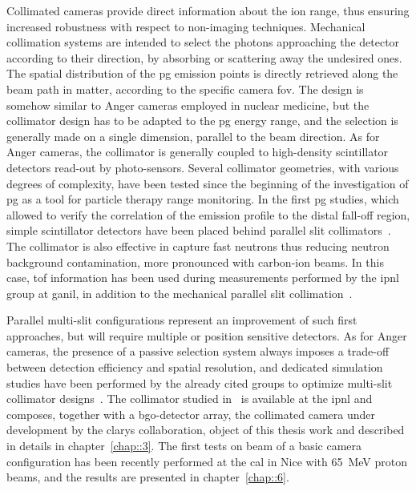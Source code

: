 Collimated cameras provide direct information about the ion range, thus ensuring increased robustness with respect to non-imaging techniques.
Mechanical collimation systems are intended to select the photons approaching the detector according to their direction, by absorbing or scattering away the undesired ones. The spatial distribution of the \gls{pg} emission points is directly retrieved along the beam path in matter, according to the specific camera \gls{fov}. The design is somehow similar to Anger cameras employed in nuclear medicine, but the collimator design has to be adapted to the \gls{pg} energy range, and the selection is generally made on a single dimension, parallel to the beam direction. As for Anger cameras, the collimator is generally coupled to high-density scintillator detectors read-out by photo-sensors.  
Several collimator geometries, with various degrees of complexity, have been tested since the beginning of the investigation of \gls{pg} as a tool for particle therapy range monitoring.
In the first \gls{pg} studies, which allowed to verify the correlation of the emission profile to the distal fall-off region, simple scintillator detectors have been placed behind parallel slit collimators~\parencite{Min2006, Min2007}. The collimator is also effective in capture fast neutrons thus reducing neutron background contamination, more pronounced with carbon-ion beams. In this case, \gls{tof} information has been used during measurements performed by the \gls{ipnl} group at \gls{ganil}, in addition to the mechanical parallel slit collimation~\parencite{Testa2008, Testa2009}. 

Parallel multi-slit configurations  represent an improvement of such first approaches, but will require multiple or position sensitive detectors. As for Anger cameras, the presence of a passive selection system always imposes a trade-off between detection efficiency and spatial resolution, and dedicated simulation studies have been performed by the already cited groups to optimize multi-slit collimator designs~\parencite{Min2012, Pinto2014}. The collimator studied in~\cite{Pinto2014} is available at the \gls{ipnl} and composes, together with a \gls{bgo}-detector array, the collimated camera under development by the \gls{clarys} collaboration, object of this thesis work and described in details in chapter~\ref{chap::3}. The first tests on beam of a basic camera configuration has been recently performed at the \gls{cal} in Nice with 65~MeV proton beams, and the results are presented in chapter~\ref{chap::6}.   

